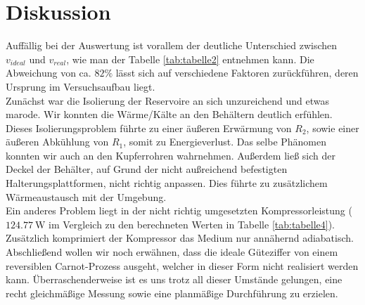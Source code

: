 \section{Diskussion}
\label{sec:Diskussion}
Auffällig bei der Auswertung ist vorallem der deutliche Unterschied zwischen $ v_{ideal} $ und $ v_{real} $, wie man der Tabelle \ref{tab:tabelle2} entnehmen kann.
Die Abweichung von ca. $82\%$ lässt sich auf verschiedene Faktoren zurückführen, deren Ursprung im Versuchsaufbau liegt.\\
Zunächst war die Isolierung der Reservoire an sich unzureichend und etwas marode.
Wir konnten die Wärme/Kälte an den Behältern deutlich erfühlen.
Dieses Isolierungsproblem führte zu einer äußeren Erwärmung von $R_2$, sowie einer äußeren Abkühlung von $R_1$, somit zu Energieverlust.
Das selbe Phänomen konnten wir auch an den Kupferrohren wahrnehmen.
Außerdem ließ sich der Deckel der Behälter, auf Grund der nicht außreichend befestigten Halterungsplattformen, nicht richtig anpassen.
Dies führte zu zusätzlichem Wärmeaustausch mit der Umgebung.\\
Ein anderes Problem liegt in der nicht richtig umgesetzten Kompressorleistung ($\SI{124,77}{\watt}$ im Vergleich zu den berechneten Werten in Tabelle \ref{tab:tabelle4}).
Zusätzlich komprimiert der Kompressor das Medium nur annähernd adiabatisch.\\
Abschließend wollen wir noch erwähnen, dass die ideale Güteziffer von einem reversiblen Carnot-Prozess ausgeht, welcher in dieser Form nicht realisiert werden kann.
Überraschenderweise ist es uns trotz all dieser Umstände gelungen, eine recht gleichmäßige Messung sowie eine planmäßige Durchführung zu erzielen.
